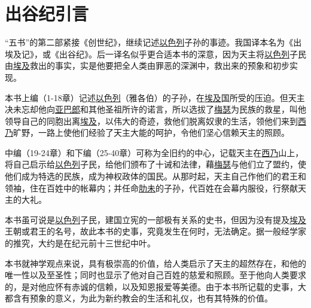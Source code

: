 \chapter*{出谷纪引言}


“五书”的第二部紧接《创世纪》，继续记述\uline{以色列}子孙的事迹。我国译本名为《出埃及记》，或《出谷纪》。后一译名似乎更合适本书的深意，因为天主将\uline{以色列}子民由\uline{埃及}救出的事实，实是他要把全人类由罪恶的深渊中，救出来的预象和初步实现。

本书上编（1-18章）记述\uline{以色列}（雅各伯）的子孙，在\uline{埃及}国所受的压迫。但天主决未忘却他向\uline{亚巴郎}和其他圣祖所许的诺言，所以选拔了\uline{梅瑟}为民族的救星，叫他领导自己的同胞出离\uline{埃及}，以伟大的奇迹，救他们脱离奴隶的生活，领他们来到\uline{西乃}旷野，一路上使他们经验了天主大能的呵护，令他们坚心信赖天主的照顾。

中编（19-24章）和下编（25-40章）可称为全旧约的中心，记载天主在\uline{西乃}山上，将自己启示给\uline{以色列}子民，给他们颁布了十诫和法律，藉\uline{梅瑟}与他们立了盟约，使他们成为特选的民族，成为神权政体的国民。从那时起，天主自己作他们的君王和领袖，住在百姓中的帐幕内；并任命\uline{肋未}的子孙，代百姓在会幕内服役，行祭献天主的大礼。

本书虽可说是\uline{以色列}子民，建国立宪的一部极有关系的史书，但因为没有提及\uline{埃及}王朝或君王的名号，故此本书的史事，究竟发生在何时，无法确定。据一般经学家的推究，大约是在纪元前十三世纪中叶。

本书就神学观点来说，具有极崇高的价值，给人类启示了天主的超然存在，和他的唯一性以及至圣性；同时也显示了他对自己百姓的慈爱和照顾。至于他向人类要求的，是对他应怀有赤诚的信赖，以及知恩报爱等美德。由于本书所记载的史事，大都含有预象的意义，为此为新约教会的生活和礼仪，也有其特殊的价值。